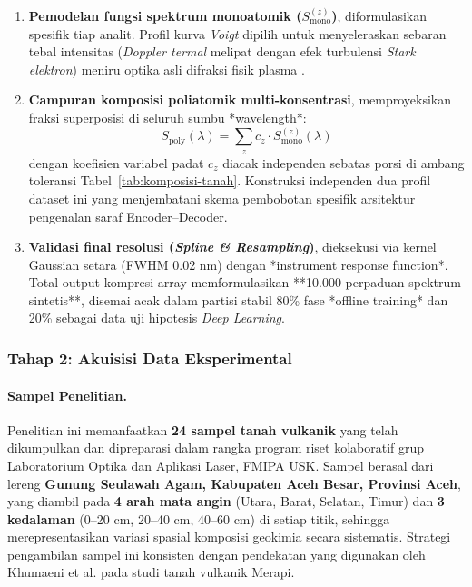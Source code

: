 \documentclass[12pt, a4paper]{article}
\begin{document}
\begin{enumerate}[label=\arabic*., leftmargin=2cm]
    \item \textbf{Pemodelan fungsi spektrum monoatomik ($S_\mathrm{mono}^{(z)}$)}, diformulasikan spesifik tiap analit. Profil kurva \textit{Voigt} dipilih untuk menyeleraskan sebaran tebal intensitas (\textit{Doppler termal} melipat dengan efek turbulensi \textit{Stark elektron}) meniru optika asli difraksi fisik plasma \citep{griem1974}.
    \item \textbf{Campuran komposisi poliatomik multi-konsentrasi}, memproyeksikan fraksi superposisi di seluruh sumbu *wavelength*:
    \begin{equation}
        S_\mathrm{poly}(\lambda) = \sum_{z} c_z \cdot S_\mathrm{mono}^{(z)}(\lambda)
    \end{equation}
    dengan koefisien variabel padat $c_z$ diacak independen sebatas porsi di ambang toleransi Tabel~\ref{tab:komposisi-tanah}. Konstruksi independen dua profil dataset ini yang menjembatani skema pembobotan spesifik arsitektur pengenalan saraf Encoder--Decoder.
    \item \textbf{Validasi final resolusi (\textit{Spline \& Resampling})}, dieksekusi via kernel Gaussian setara (FWHM 0.02 nm) dengan *instrument response function*. Total output kompresi array memformulasikan **10.000 perpaduan spektrum sintetis**, disemai acak dalam partisi stabil 80\% fase *offline training* dan 20\% sebagai data uji hipotesis \textit{Deep Learning}.
\end{enumerate}

\subsubsection{Tahap 2: Akuisisi Data Eksperimental}

\paragraph{Sampel Penelitian.}
Penelitian ini memanfaatkan \textbf{24 sampel tanah vulkanik} yang telah dikumpulkan dan dipreparasi dalam rangka program riset kolaboratif grup Laboratorium Optika dan Aplikasi Laser, FMIPA USK. Sampel berasal dari lereng \textbf{Gunung Seulawah Agam, Kabupaten Aceh Besar, Provinsi Aceh}, yang diambil pada \textbf{4 arah mata angin} (Utara, Barat, Selatan, Timur) dan \textbf{3 kedalaman} (0--20 cm, 20--40 cm, 40--60 cm) di setiap titik, sehingga merepresentasikan variasi spasial komposisi geokimia secara sistematis. Strategi pengambilan sampel ini konsisten dengan pendekatan yang digunakan oleh Khumaeni et al. \citep{khumaeni_analysis_2025} pada studi tanah vulkanik Merapi.
\end{document}
